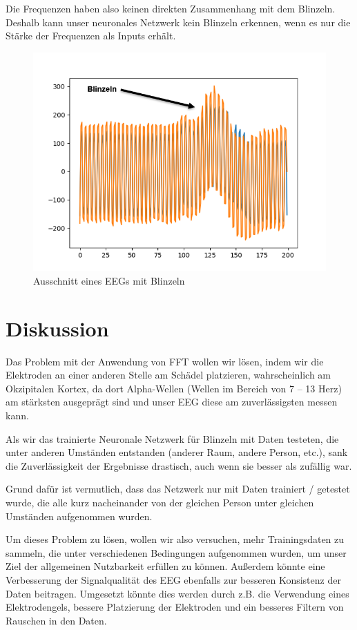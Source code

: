 \documentclass{scrartcl}
\begin{document}
	Die Frequenzen haben also keinen direkten Zusammenhang mit dem Blinzeln. Deshalb kann unser neuronales Netzwerk kein Blinzeln erkennen, wenn es nur die Stärke der Frequenzen als Inputs erhält.

	\begin{figure}[h]
		\includegraphics{pictures/blinzeln_ekp_beispiel_pyplot_annotated.png}
		\caption{Ausschnitt eines EEGs mit Blinzeln}
	\end{figure}

	\section{Diskussion}

	Das Problem mit der Anwendung von FFT wollen wir lösen, indem wir die Elektroden an einer anderen Stelle am Schädel platzieren, wahrscheinlich am Okzipitalen Kortex, da dort Alpha-Wellen (Wellen im Bereich von 7 – 13 Herz) am stärksten ausgeprägt sind und unser EEG diese am zuverlässigsten messen kann.

	Als wir das trainierte Neuronale Netzwerk für Blinzeln mit Daten testeten, die unter anderen Umständen entstanden (anderer Raum, andere Person, etc.), sank die Zuverlässigkeit der Ergebnisse drastisch, auch wenn sie besser als zufällig war.

	Grund dafür ist vermutlich, dass das Netzwerk nur mit Daten trainiert / getestet wurde, die alle kurz nacheinander von der gleichen Person unter gleichen Umständen aufgenommen wurden.

	Um dieses Problem zu lösen, wollen wir also versuchen, mehr Trainingsdaten zu sammeln, die unter verschiedenen Bedingungen aufgenommen wurden, um unser Ziel der allgemeinen Nutzbarkeit erfüllen zu können. Außerdem könnte eine Verbesserung der Signalqualität des EEG ebenfalls zur besseren Konsistenz der Daten beitragen. Umgesetzt könnte dies werden durch z.B. die Verwendung eines Elektrodengels, bessere Platzierung der Elektroden und ein besseres Filtern von Rauschen in den Daten.
\end{document}
